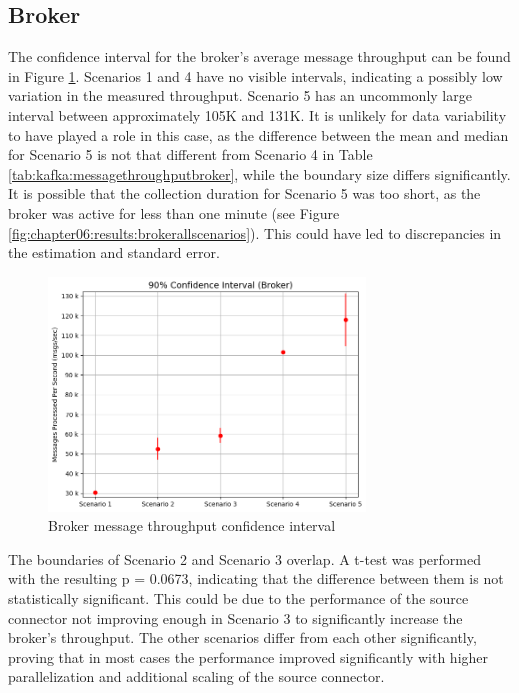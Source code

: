 \subsection{Broker}
The confidence interval for the broker's average message throughput can be found in Figure \ref{fig:chapter07:discussion:brokermessageci}. Scenarios 1 and 4 have no visible intervals, indicating a possibly low variation in the measured throughput. Scenario 5 has an uncommonly large interval between approximately 105K and 131K. It is unlikely for data variability to have played a role in this case, as the difference between the mean and median for Scenario 5 is not that different from Scenario 4 in Table \ref{tab:kafka:messagethroughputbroker}, while the boundary size differs significantly. It is possible that the collection duration for Scenario 5 was too short, as the broker was active for less than one minute (see Figure \ref{fig:chapter06:results:brokerallscenarios}). This could have led to discrepancies in the estimation and standard error.

\begin{figure}[htbp]
    \centering
    \includegraphics[width=0.75\textwidth]{chapters/images/confidence-intervals/broker-message-ci.png}
    \caption{Broker message throughput confidence interval}
    \label{fig:chapter07:discussion:brokermessageci}
\end{figure}

The boundaries of Scenario 2 and Scenario 3 overlap. A t-test was performed with the resulting p = 0.0673, indicating that the difference between them is not statistically significant. This could be due to the performance of the source connector not improving enough in Scenario 3 to significantly increase the broker's throughput. The other scenarios differ from each other significantly, proving that in most cases the performance improved significantly with higher parallelization and additional scaling of the source connector.

